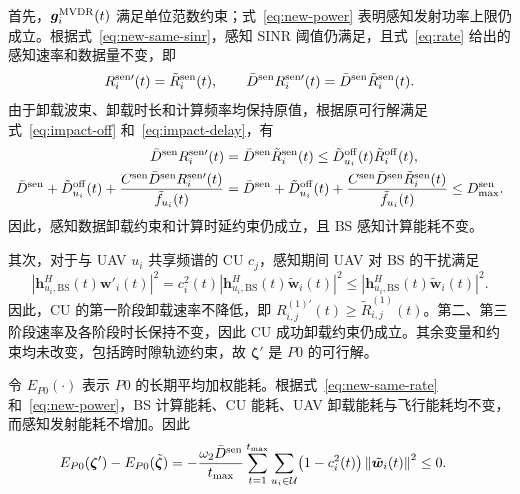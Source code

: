 \documentclass[11pt,a4paper]{ctexart}
\begin{document}
首先，$\bm g_i^{\rm MVDR}(t)$ 满足单位范数约束；式~\eqref{eq:new-power} 表明感知发射功率上限仍成立。根据式~\eqref{eq:new-same-sinr}，感知 SINR 阈值仍满足，且式~\eqref{eq:rate} 给出的感知速率和数据量不变，即
\begin{equation}\label{eq:new-same-rate}
R_i^{\rm sen\prime}(t)=\tilde R_i^{\rm sen}(t),\qquad
\bar D^{\rm sen}R_i^{\rm sen\prime}(t)=\bar D^{\rm sen}\tilde R_i^{\rm sen}(t).
\end{equation}
由于卸载波束、卸载时长和计算频率均保持原值，根据原可行解满足式~\eqref{eq:impact-off} 和~\eqref{eq:impact-delay}，有
\begin{align}
\bar D^{\rm sen}R_i^{\rm sen\prime}(t)
&=\bar D^{\rm sen}\tilde R_i^{\rm sen}(t)
\le \tilde D_{u_i}^{\rm off}(t)\tilde R_i^{\rm off}(t),\label{eq:new-off}\\
\bar D^{\rm sen}+\tilde D_{u_i}^{\rm off}(t)
+\frac{C^{\rm sen}\bar D^{\rm sen}R_i^{\rm sen\prime}(t)}{\tilde f_{u_i}(t)}
&=\bar D^{\rm sen}+\tilde D_{u_i}^{\rm off}(t)
+\frac{C^{\rm sen}\bar D^{\rm sen}\tilde R_i^{\rm sen}(t)}{\tilde f_{u_i}(t)}
\le D_{\max}^{\rm sen}.\label{eq:new-delay}
\end{align}
因此，感知数据卸载约束和计算时延约束仍成立，且 BS 感知计算能耗不变。

其次，对于与 UAV $u_i$ 共享频谱的 CU $c_j$，感知期间 UAV 对 BS 的干扰满足
\begin{equation}\label{eq:new-interference}
\left|\bm h_{u_i,\mathrm{BS}}^H(t)\bm w'_i(t)\right|^2
=c_i^2(t)\left|\bm h_{u_i,\mathrm{BS}}^H(t)\tilde{\bm w}_i(t)\right|^2
\le\left|\bm h_{u_i,\mathrm{BS}}^H(t)\tilde{\bm w}_i(t)\right|^2.
\end{equation}
因此，CU 的第一阶段卸载速率不降低，即 $R_{i,j}^{(1)\prime}(t)\ge\tilde R_{i,j}^{(1)}(t)$。第二、第三阶段速率及各阶段时长保持不变，因此 CU 成功卸载约束仍成立。其余变量和约束均未改变，包括跨时隙轨迹约束，故 $\bm\zeta'$ 是 $P0$ 的可行解。

令 $E_{P0}(\cdot)$ 表示 $P0$ 的长期平均加权能耗。根据式~\eqref{eq:new-same-rate} 和~\eqref{eq:new-power}，BS 计算能耗、CU 能耗、UAV 卸载能耗与飞行能耗均不变，而感知发射能耗不增加。因此
\begin{align}\label{eq:new-objective}
E_{P0}(\bm\zeta')-E_{P0}(\tilde{\bm\zeta})
&=-\frac{\omega_2\bar D^{\rm sen}}{t_{\max}}
\sum_{t=1}^{t_{\max}}\sum_{u_i\in\mathcal U}
\bigl(1-c_i^2(t)\bigr)\left\|\tilde{\bm w}_i(t)\right\|^2
\le0.
\end{align}
\end{document}
